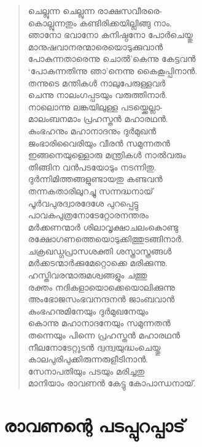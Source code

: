 \begin{verse}
ചെല്ലുന്ന ചെല്ലുന്ന രാക്ഷസവീരരെ-\\
കൊല്ലുന്നതും കണ്ടിരിക്കയില്ലിങ്ങു നാം.\\
ഞാനോ ഭവാനോ കനിഷ്ഠനോ പോര്‍ചെയ്തു\\
മാനുഷവാനരന്മാരെയൊടുക്കുവാന്‍\\
പോകുന്നതാരെന്നു ചൊല്‍’കെന്നു കേട്ടവന്‍\\
‘പോകുന്നതിന്നു ഞാ’നെന്നു കൈകൂപ്പിനാന്‍.\\
തന്നുടെ മന്തികള്‍ നാലുപേരുള്ളവര്‍\\
ചെന്നു നാലംഗപ്പടയും വരുത്തിനാര്‍.\\
നാലൊന്നു ലങ്കയിലുള്ള പടയ്ക്കെല്ലാ-\\
മാലംബനമാം പ്രഹസ്തന്‍ മഹാരഥന്‍.\\
കുംഭഹനും മഹാനാദനും ദുര്‍മുഖന്‍\\
ജംഭാരിവൈരിയും വീരന്‍ സമുന്നതന്‍\\
ഇങ്ങനെയുള്ളൊരു മന്ത്രികള്‍ നാല്‍വരും\\
തിങ്ങിന വന്‍പടയോടും നടന്നിതു.\\
ദുര്‍ന്നിമിത്തങ്ങളുണ്ടായതു കണ്ടവന്‍\\
തന്നകതാരിലുറച്ചു സന്നദ്ധനായ്\\
പൂര്‍വപുരദ്വാരദേശേ പുറപ്പെട്ടു\\
പാവകപുത്രനോടേറ്റോരനന്തരം\\
മര്‍ക്കണന്മാര്‍ ശിലാവൃക്ഷാചലംകൊണ്ടു\\
രക്ഷോഗണത്തെയൊടുക്കിത്തുടങ്ങിനാര്‍.\\
ചക്രഖഡ്ഗപ്രാസശക്തി ശസ്ത്രാസ്ത്രങ്ങള്‍\\
മര്‍ക്കടന്മാര്‍ക്കുമേറ്റൊക്കെ മരിക്കുന്നു.\\
ഹസ്തിവരന്മാരുമശ്വങ്ങളും ചത്തു\\
രക്തം നദികളായൊക്കെയൊലിക്കുന്നു\\
അംഭോജസംഭവനന്ദനന്‍ ജാംബവാന്‍\\
കുംഭഹനുമിനേയും ദുര്‍മുഖനേയും\\
കൊന്നു മഹാനാദനേയും സമുന്നതന്‍\\
തന്നെയും പിന്നെ പ്രഹസ്തന്‍ മഹാരഥന്‍\\
നീലനോടേറ്റുടന്‍ ദ്വന്ദ്വയുദ്ധംചെയ്തു\\
കാലപുരിപുക്കിരുന്നരുളീടിനാന്‍.\\
സേനാപതിയും പടയും മരിച്ചതു\\
മാനിയാം രാവണന്‍ കേട്ടു കോപാന്ധനായ്.
\end{verse}


\section{രാവണന്റെ പടപ്പുറപ്പാട്}

